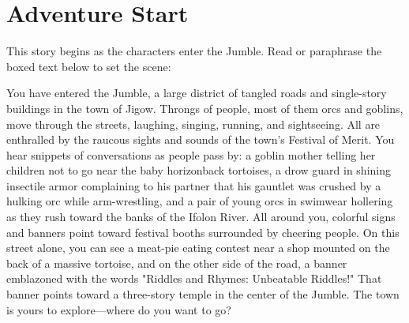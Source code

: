 \documentclass[10pt,a4,twoside,twocolumn,openany,nodeprecatedcode]{dndbook}
\begin{document}
\section{Adventure Start}
This story begins as the characters enter the Jumble. Read or paraphrase the boxed text below to set the scene:
\begin{DndReadAloud}{}
You have entered the Jumble, a large district of tangled roads and single-story buildings in the town of Jigow. Throngs of people, most of them orcs and goblins, move through the streets, laughing, singing, running, and sightseeing. All are enthralled by the raucous sights and sounds of the town's Festival of Merit.
You hear snippets of conversations as people pass by: a goblin mother telling her children not to go near the baby horizonback tortoises, a drow guard in shining insectile armor complaining to his partner that his gauntlet was crushed by a hulking orc while arm-wrestling, and a pair of young orcs in swimwear hollering as they rush toward the banks of the Ifolon River.
All around you, colorful signs and banners point toward festival booths surrounded by cheering people. On this street alone, you can see a meat-pie eating contest near a shop mounted on the back of a massive tortoise, and on the other side of the road, a banner emblazoned with the words "Riddles and Rhymes: Unbeatable Riddles!" That banner points toward a three-story temple in the center of the Jumble. The town is yours to explore—where do you want to go?
\end{DndReadAloud}
\end{document}
